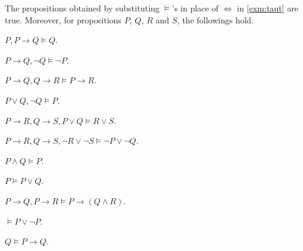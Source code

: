 \begin{example}
    \label{prop:consq}
    The propositions obtained
    by substituting \(\models\)'s in place of \(\iff\)
    in \cref{exm:taut}
    are true.
    Moreover,
    for propositions \(P\), \(Q\), \(R\) and \(S\),
    the followings hold.
    \begin{nlist}
        \item \(P,P\to Q\models Q\).
        \item \(P\to Q,\neg Q\models \neg P\).
        \item \(P\to Q,Q\to R\models P\to R\).
        \item \(P\vee Q,\neg Q\models P\).
        \item \(P\to R,Q\to S,P\vee Q\models R\vee S\).
        \item \(P\to R,Q\to S,\neg R\vee\neg S\models\neg P\vee\neg Q\).
        \item \(P\wedge Q\models P\).
        \item \(P\models P\vee Q\).
        \item \(P\to Q, P\to R\models P\to(Q\wedge R)\).
        \item \(\models P\vee\neg P\).
        \item \(Q\models P\to Q\).
    \end{nlist}
\end{example}

